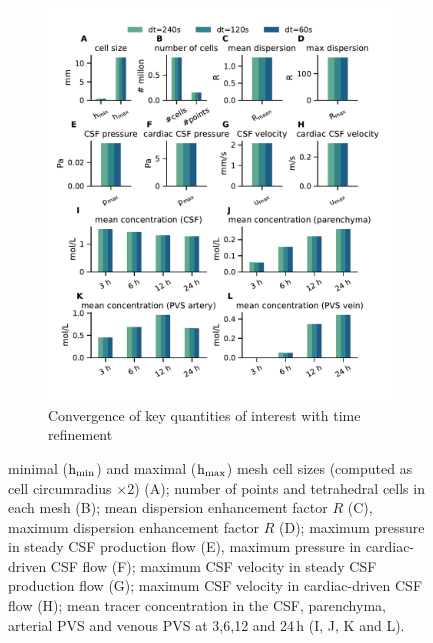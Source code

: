 \documentclass[fleqn,10pt]{wlscirep}
\begin{document}
\begin{figure}
\begin{subfigure}[b]{0.49\textwidth}
     \includegraphics[trim={0.5cm 1cm 0.05cm 0.8cm}, clip,width= 1.05 \linewidth]{figures/time_refinement.pdf}
        \caption{Convergence of key quantities of interest with time refinement}
        \label{fig:time_convergence}
    \end{subfigure}
    \caption{minimal ($\rm h_{min}$) and maximal ($\rm h_{max}$) mesh cell sizes (computed as cell circumradius $\times 2$) (A); number of points and tetrahedral cells in each mesh (B); mean dispersion enhancement factor $R$ (C), maximum dispersion enhancement factor $R$ (D); maximum pressure in steady CSF production flow (E), maximum pressure in cardiac-driven CSF flow (F); maximum CSF velocity in steady CSF production flow (G); maximum CSF velocity in cardiac-driven CSF flow (H);  mean tracer concentration in the CSF, parenchyma, arterial PVS and venous PVS at 3,6,12 and 24\,h (I, J, K and L).}
\end{figure}
\end{document}
